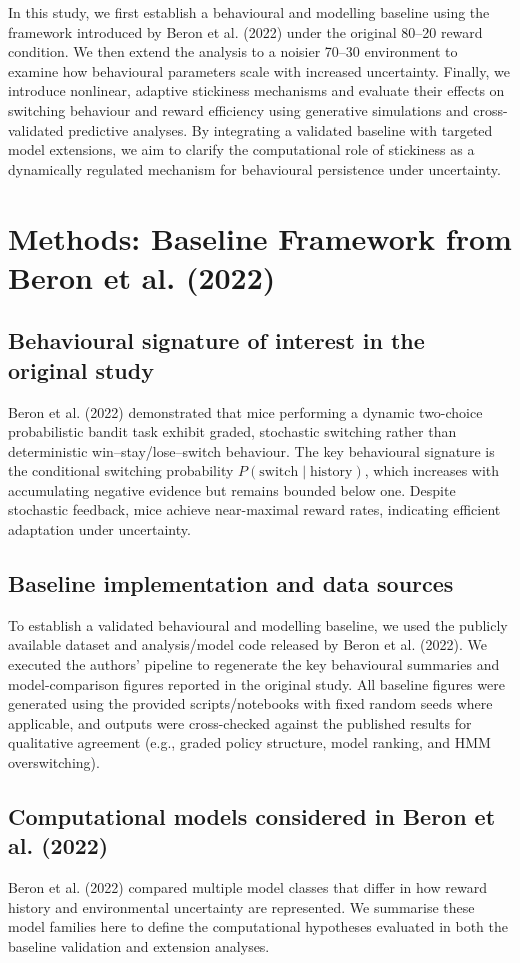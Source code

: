 \documentclass[11pt, reprint, aps, prl]{revtex4-2}
\begin{document}
In this study, we first establish a behavioural and modelling baseline using the framework introduced by Beron et al. (2022) under the original 80--20 reward condition. We then extend the analysis to a noisier 70--30 environment to examine how behavioural parameters scale with increased uncertainty. Finally, we introduce nonlinear, adaptive stickiness mechanisms and evaluate their effects on switching behaviour and reward efficiency using generative simulations and cross-validated predictive analyses. By integrating a validated baseline with targeted model extensions, we aim to clarify the computational role of stickiness as a dynamically regulated mechanism for behavioural persistence under uncertainty.


\section{Methods: Baseline Framework from Beron et al. (2022)}
\subsection{Behavioural signature of interest in the original study}
Beron et al. (2022) demonstrated that mice performing a dynamic two-choice probabilistic bandit task exhibit graded, stochastic switching rather than deterministic win--stay/lose--switch behaviour. The key behavioural signature is the conditional switching probability $P(\mathrm{switch}\mid\mathrm{history})$, which increases with accumulating negative evidence but remains bounded below one. Despite stochastic feedback, mice achieve near-maximal reward rates, indicating efficient adaptation under uncertainty.
\subsection{Baseline implementation and data sources}
To establish a validated behavioural and modelling baseline, we used the publicly available dataset and analysis/model code released by Beron et al. (2022). We executed the authors' pipeline to regenerate the key behavioural summaries and model-comparison figures reported in the original study. All baseline figures were generated using the provided scripts/notebooks with fixed random seeds where applicable, and outputs were cross-checked against the published results for qualitative agreement (e.g., graded policy structure, model ranking, and HMM overswitching).
\subsection{Computational models considered in Beron et al. (2022)}
Beron et al. (2022) compared multiple model classes that differ in how reward history and environmental uncertainty are represented. We summarise these model families here to define the computational hypotheses evaluated in both the baseline validation and extension analyses.
\end{document}
